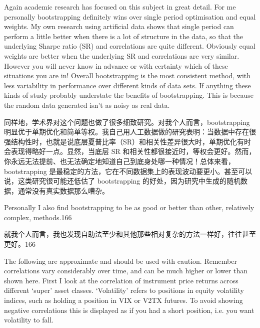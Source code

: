 \begin{englishblock} Again academic research has focused on this subject in great detail. For me personally bootstrapping definitely wins over single period optimisation and equal weights. My own research using artificial data shows that single period can perform a little better when there is a lot of structure in the data, so that the underlying Sharpe ratio (SR) and correlations are quite different. Obviously equal weights are better when the underlying SR and correlations are very similar. However you will never know in advance or with certainty which of these situations you are in! Overall bootstrapping is the most consistent method, with less variability in performance over different kinds of data sets. If anything these kinds of study probably understate the benefits of bootstrapping. This is because the random data generated isn't as noisy as real data. \end{englishblock}

\begin{chineseblock}同样地，学术界对这个问题也做了很多细致研究。对我个人而言，bootstrapping 明显优于单期优化和简单等权。我自己用人工数据做的研究表明：当数据中存在很强结构性时，也就是说底层夏普比率（SR）和相关性差异很大时，单期优化有时会表现得略好一点。显然，当底层 SR 和相关性都很接近时，等权会更好。然而，你永远无法提前、也无法确定地知道自己到底身处哪一种情况！总体来看，bootstrapping 是最稳定的方法，它在不同数据集上的表现波动要更小。甚至可以说，这类研究很可能还低估了 bootstrapping 的好处，因为研究中生成的随机数据，通常没有真实数据那么嘈杂。\end{chineseblock}

\bipairgap

\begin{englishblock} Personally I also find bootstrapping to be as good or better than other, relatively complex, methods.166 \end{englishblock}

\begin{chineseblock}就我个人而言，我也发现自助法至少和其他那些相对复杂的方法一样好，往往甚至更好。166 \end{chineseblock}


\begin{englishblock} The following are approximate and should be used with caution. Remember correlations vary considerably over time, and can be much higher or lower than shown here. First I look at the correlation of instrument price returns across different ‘super' asset classes. ‘Volatility' refers to positions in equity volatility indices, such as holding a position in VIX or V2TX futures. To avoid showing negative correlations this is displayed as if you had a short position, i.e. you want volatility to fall. \end{englishblock}


